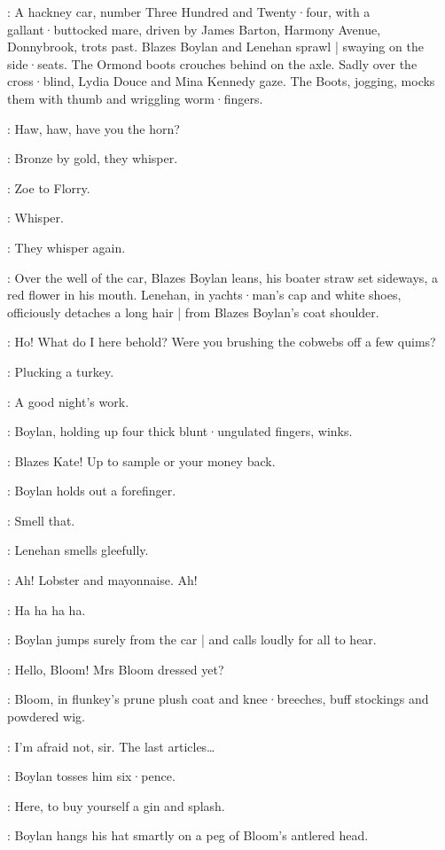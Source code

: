 :
A hackney car,
number Three Hundred and Twenty·four,
with a gallant·butt\-ocked mare,
driven by James Barton,
Harmony Avenue,
Donnybrook,
trots past.
Blazes Boylan and Lenehan sprawl |
swaying on the side·seats.
The Ormond boots crouches behind on the axle.
%
Sadly over the cross·blind,
Lydia Douce and Mina Kennedy gaze.
The Boots,
jogging,
mocks them with thumb and wriggling worm·fingers.

\Boots:
Haw,
haw,
have you the horn?

:
Bronze by gold,
they whisper.

:
Zoe to Florry.

\Zoe:
Whisper.

:
They whisper again.

:
Over the well of the car,
Blazes Boylan leans,
his boater straw set sideways,
a red flower in his mouth.
Lenehan,
in yachts·man's cap and white shoes,
%
officiously detaches a long hair |
from Blazes Boylan's coat shoulder.

\Lenehan:
Ho!
What do I here behold?
Were you brushing the cobwebs off a few quims?

\Boylan:
Plucking a turkey.

\Lenehan:
A good night's work.

:
Boylan,
holding up four thick blunt·ungulated fingers,
winks.

\Boylan:
Blazes Kate!
Up to sample or your money back.

:
Boylan holds out a forefinger.

\Boylan:
Smell that.

:
Lenehan smells gleefully.

\Lenehan:
Ah!
Lobster and mayonnaise.
Ah!

\ZoeAndFlorry:
Ha ha ha ha.

:
Boylan jumps surely from the car |
and calls loudly for all to hear.

\Boylan:
Hello,
Bloom!
Mrs Bloom dressed yet?

:
Bloom,
in flunkey's prune plush coat and knee·breeches,
%
buff stockings and powdered wig.

\Bloom:
I'm afraid not,
sir.
The last articles…

:
Boylan tosses him six·pence.

\Boylan:
Here,
to buy yourself a gin and splash.

:
Boylan hangs his hat smartly on a peg of Bloom's antlered head.


